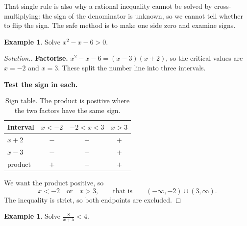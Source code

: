 \documentclass[11pt,a4paper]{article}
\theoremstyle{definition}
\newtheorem{example}[thm]{Example}
\newenvironment{solution}
  {\renewcommand{\qedsymbol}{}\begin{proof}[\textit{Solution}.]}
  {\end{proof}}
\begin{document}
That single rule is also why a rational inequality cannot be solved by
cross-multiplying: the sign of the denominator is unknown, so we cannot tell whether to
flip the sign. The safe method is to make one side zero and examine signs.

\begin{example}
Solve $x^2-x-6>0$.
\end{example}

\begin{solution}
\textbf{Factorise.} $x^2-x-6=(x-3)(x+2)$, so the critical values are $x=-2$ and
$x=3$. These split the number line into three intervals.

\textbf{Test the sign in each.}
\begin{table}[H]
\centering
\begin{tabular}{|l|c|c|c|}
\hline
Interval & $x<-2$ & $-2<x<3$ & $x>3$\\
\hline
$x+2$ & $-$ & $+$ & $+$\\
$x-3$ & $-$ & $-$ & $+$\\
\hline
product & $+$ & $-$ & $+$\\
\hline
\end{tabular}
\caption{Sign table. The product is positive where the two factors have the same sign.}
\end{table}

We want the product positive, so
$$x<-2\quad\text{or}\quad x>3,\qquad\text{that is}\qquad (-\infty,-2)\cup(3,\infty).$$
The inequality is strict, so both endpoints are excluded.
\end{solution}

\begin{example}
Solve $\frac{8}{x+5}<4$.
\end{example}
\end{document}
